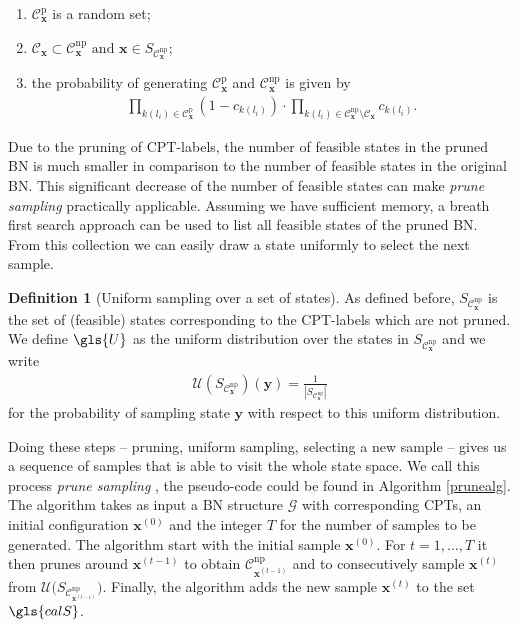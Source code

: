 \documentclass[a4paper, twoside, 11pt]{report}
\newcommand{\bfx}{{\mathbf{x}}}
\newcommand{\C}{{\mathcal C}}
\newcommand{\U}{{\mathcal{U}}}
\theoremstyle{plain}
\theoremstyle{definition}
\newtheorem{definition}[thm]{Definition}
\theoremstyle{remark}
\newcommand{\G}{{\mathcal G}}
\newcommand{\ps}{\textit{prune sampling }}
\newcommand{\bfy}{{\mathbf{y}}}
\begin{document}
\begin{enumerate}
\item $\C_\bfx^{\text{p}}$ is a random set;
\item $\C_\bfx \subset \C_\bfx^{\text{np}} \text{ and } \bfx \in S_{\C_\bfx^{\text{np}}}$;
\item the probability of generating $\C_\bfx^{\text{p}}$ and $\C_\bfx^{\text{np}}$ is given by
\begin{align*}
\prod_{k(l_i) \in \C_\bfx^{\text{p}}}(1-c_{k(l_i)}) \cdot \prod_{k(l_i) \in \C_\bfx^{\text{np}} \setminus \C_{\bfx}} c_{k(l_i)}.
\end{align*}
\end{enumerate}
Due to the pruning of CPT-labels, the number of feasible states in the pruned BN is much smaller in comparison to the number of feasible states in the original BN. This significant decrease of the number of feasible states can make \ps practically applicable. Assuming we have sufficient memory, a breath first search approach can be used to list all feasible states of the pruned BN. From this collection we can easily draw a state uniformly to select the next sample.

\begin{definition}[Uniform sampling over a set of states]
As defined before, $S_{\C_\bfx^{\text{np}}}$ is the set of (feasible) states corresponding to the CPT-labels which are not pruned. We define $\gls{U}$
as the uniform distribution over the states in $S_{\C_\bfx^{\text{np}}}$ and we write
\begin{align*}
\U(S_{\C_\bfx^{\text{np}}})(\bfy) = \frac{1}{|S_{\C_\bfx^{\text{np}}}|}
\end{align*}
for the probability of sampling state $\bfy$ with respect to this uniform distribution.
\end{definition}
Doing these steps -- pruning, uniform sampling, selecting a new sample --  gives us a sequence of samples that is able to visit the whole state space. We call this process \ps, the pseudo-code could be found in Algorithm \ref{prunealg}. The algorithm takes as input a BN structure $\G$ with corresponding CPTs, an initial configuration $\bfx^{(0)}$ and the integer $T$ for the number of samples to be generated. The algorithm start with the initial sample $\bfx^{(0)}$. For $t = 1, \ldots , T$ it then prunes around $\bfx^{(t-1)}$ to obtain $\C_{\bfx^{(t-1)}}^{\text{np}}$ and to consecutively sample $\bfx^{(t)}$ from $\U\big( S_{\C_{\bfx^{(t-1)}}^{\text{np}}} \big)$. Finally, the algorithm adds the new sample $\bfx^{(t)}$ to the set $\gls{calS}$.  \\
\end{document}
